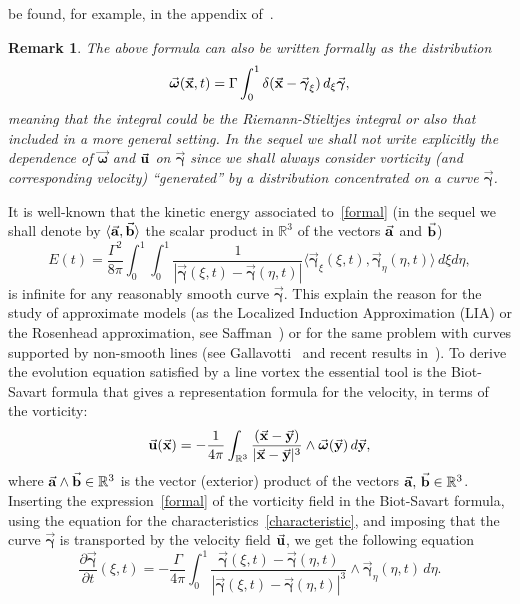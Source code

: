 \documentclass[a4paper,11pt]{article}
\numberwithin{equation}{section}
\newtheorem{remark}{Remark}
\newcommand{\R}{\mathbb{R}}
\newcommand{\la}{\langle}
\newcommand{\ra}{\rangle}
\newcommand{\U}{\mbox{$\vec{\bf u}$}}
\newcommand{\bgamma}{\mbox{$\vec{\boldsymbol \gamma}$}}
\newcommand{\vomega}{\mbox{$\vec{\boldsymbol\omega}$}}
\newcommand{\x}{\mbox{$\vec{\bf x}$}}
\newcommand{\y}{\mbox{$\vec{\bf y}$}}
\begin{document}
be found, for example, in the appendix of~\cite{bb}.     
\begin{remark}
The above formula can also be written formally as the distribution
\begin{equation*}%
  \vomega(\x,t)=\Gamma\int_0^1\delta(\x-\bgamma_\xi)\,d_\xi
  \bgamma,
\end{equation*}
meaning that the integral could be the Riemann-Stieltjes integral or
also that included in a more general setting. In the sequel we shall
not write explicitly the dependence of $\vomega$ and $\U$ on $\bgamma$
since we shall always consider vorticity (and corresponding velocity)
``generated'' by a distribution concentrated on a curve
$\bgamma$. \end{remark} 
%
It is well-known that the kinetic energy associated to~\eqref{formal}
  (in the sequel we shall denote by $\la \vec{\bf a},\vec{\bf b}\ra$
  the scalar product in $\R^3$ of the vectors $\vec{\bf a}$ and
  $\vec{\bf b}$) 
\begin{equation*}%
E(t)=\frac{\Gamma^2}{8\pi}\int_0^1\int_0^1\frac{1}
{\displaystyle|\bgamma(\xi,t)-\bgamma(\eta,t)|}
\la{\bgamma_\xi}(\xi,t),\bgamma_\eta(\eta,t)\ra\,d\xi 
    d\eta,  
\end{equation*}
is infinite for any reasonably smooth curve $\bgamma$. This explain
the reason for the study of approximate models (as the Localized
Induction Approximation (LIA) or the Rosenhead approximation,
see Saffman~\cite{s}) or for the same problem with curves supported by
non-smooth lines (see Gallavotti~\cite{g} and recent results
in~\cite{BGR}). To derive the evolution equation satisfied by a line
vortex the essential tool is the Biot-Savart formula that gives a
representation formula for the velocity, in terms of the vorticity:  
\begin{equation*}%
\U(\x)=-\frac{1}{4\pi}
\int_{\R^3}\frac{(\x-\y)}{|\x-\y|^3}\wedge \vomega(\y)\,d\y, 
\end{equation*}
where $\vec{\bf a}\wedge \vec{\bf b}\in\R^3$ is the vector (exterior)
product of the vectors $\vec{\bf a},\,\vec{\bf b} \in \mathbb{R}^3$.
Inserting the expression~\eqref{formal} of the vorticity field in the
Biot-Savart formula, using the equation for the
characteristics~\eqref{characteristic}, and imposing that the curve
$\bgamma$ is transported by the velocity field $\U$, we get the
following equation
\begin{equation*}%
\frac{\partial\bgamma}{\partial
    t}(\xi,t)=-\frac{\Gamma}{4\pi}\int_0^1{\frac{\bgamma(\xi,t)-
\bgamma(\eta,t)}{|\bgamma(\xi,t)-
\bgamma(\eta,t)|^3}\wedge
\bgamma_\eta(\eta,t)}\,d\eta.
\end{equation*}
\end{document}
